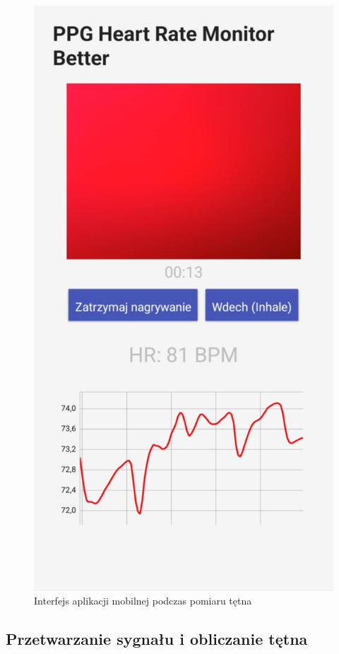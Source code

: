 \documentclass{article}
\begin{document}
\begin{figure}[h]
    \centering
    \includegraphics[scale=0.2]{aplikacja.png}
    \caption{Interfejs aplikacji mobilnej podczas pomiaru tętna }
\end{figure}
\newpage
\subsection{Przetwarzanie sygnału i obliczanie tętna}
\end{document}
